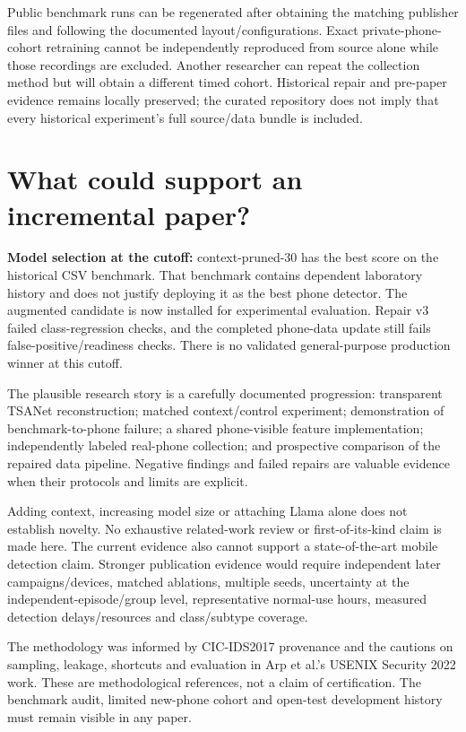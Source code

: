 \documentclass[11pt,a4paper,oneside]{report}
\begin{document}
Public benchmark runs can be regenerated after obtaining the matching publisher files and following the documented layout/configurations. Exact private-phone-cohort retraining cannot be independently reproduced from source alone while those recordings are excluded. Another researcher can repeat the collection method but will obtain a different timed cohort. Historical repair and pre-paper evidence remains locally preserved; the curated repository does not imply that every historical experiment's full source/data bundle is included.

\section{What could support an incremental paper?}
\textbf{Model selection at the cutoff:} context-pruned-30 has the best score on the historical CSV benchmark. That benchmark contains dependent laboratory history and does not justify deploying it as the best phone detector. The augmented candidate is now installed for experimental evaluation. Repair v3 failed class-regression checks, and the completed phone-data update still fails false-positive/readiness checks. There is no validated general-purpose production winner at this cutoff.

The plausible research story is a carefully documented progression: transparent TSANet reconstruction; matched context/control experiment; demonstration of benchmark-to-phone failure; a shared phone-visible feature implementation; independently labeled real-phone collection; and prospective comparison of the repaired data pipeline. Negative findings and failed repairs are valuable evidence when their protocols and limits are explicit.

Adding context, increasing model size or attaching Llama alone does not establish novelty. No exhaustive related-work review or first-of-its-kind claim is made here. The current evidence also cannot support a state-of-the-art mobile detection claim. Stronger publication evidence would require independent later campaigns/devices, matched ablations, multiple seeds, uncertainty at the independent-episode/group level, representative normal-use hours, measured detection delays/resources and class/subtype coverage.

The methodology was informed by CIC-IDS2017 provenance and the cautions on sampling, leakage, shortcuts and evaluation in Arp et al.'s USENIX Security 2022 work. These are methodological references, not a claim of certification. The benchmark audit, limited new-phone cohort and open-test development history must remain visible in any paper.
\end{document}
